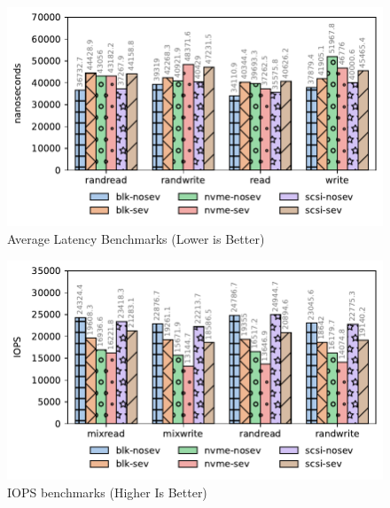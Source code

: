 \documentclass[twocolumn]{article}
\begin{document}
\begin{figure}
    \centering
    \includegraphics[width=\columnwidth]{img/al.pdf}
    \caption{Average Latency Benchmarks (Lower is Better)}
    \label{fig:fio-al}
\end{figure}

\begin{figure}
    \centering
    \includegraphics[width=\columnwidth]{img/iops.pdf}
    \caption{IOPS benchmarks (Higher Is Better)}
    \label{fig:fio-iops}
\end{figure}
\end{document}
